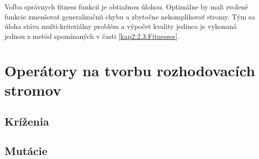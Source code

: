 Voľba správnych fitness funkcií je obtiažnou úlohou. Optimálne by mali zvolené funkcie zmenšovať generalizačnú chybu a zbytočne nekomplikovať stromy. Tým sa úloha stáva multi-kriteriálny problém a výpočet kvality jedinca je vykonaná jednou z metód spomínaných v časti \ref{kap2:2.3:Fitnesses}.
\section{Operátory na tvorbu rozhodovacích stromov}\label{kap3:3.4:Operators}

\subsection{Kríženia}\label{kap3:3.4:3.4.1:Crossover}
\subsection{Mutácie}\label{kap3:3.4:3.4.2:Mutation}

